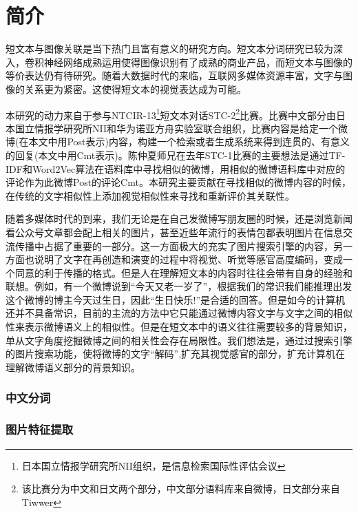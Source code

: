 \chapter{简介}
短文本与图像关联是当下热门且富有意义的研究方向。短文本分词研究已较为深入，卷积神经网络成熟运用使得图像识别有了成熟的商业产品，而短文本与图像的等价表达仍有待研究。随着大数据时代的来临，互联网多媒体资源丰富，文字与图像的关系更为紧密。这使得短文本的视觉表达成为可能。

本研究的动力来自于参与NTCIR-13\footnote{日本国立情报学研究所NII组织，是信息检索国际性评估会议}短文本对话STC-2\footnote{该比赛分为中文和日文两个部分，中文部分语料库来自微博，日文部分来自Tiwwer }比赛。比赛中文部分由日本国立情报学研究所NII和华为诺亚方舟实验室联合组织，比赛内容是给定一个微博(在本文中用Post表示)内容，构建一个检索或者生成系统来得到连贯的、有意义的回复(本文中用Cmt表示)。陈仲夏师兄在去年STC-1比赛的主要想法是通过TF-IDF和Word2Vec算法在语料库中寻找相似的微博，用相似的微博语料库中对应的评论作为此微博Post的评论Cmt。本研究主要贡献在寻找相似的微博内容的时候，在传统的文字相似性上添加视觉相似性来寻找和重新评价其关联性。

随着多媒体时代的到来，我们无论是在自己发微博写朋友圈的时候，还是浏览新闻看公众号文章都会配上相关的图片，甚至近些年流行的表情包都表明图片在信息交流传播中占据了重要的一部分。这一方面极大的充实了图片搜索引擎的内容，另一方面也说明了文字在再创造和演变的过程中将视觉、听觉等感官高度编码，变成一个同意的利于传播的格式。但是人在理解短文本的内容时往往会带有自身的经验和联想。例如，有一个微博说到“今天又老一岁了”，根据我们的常识我们能推理出发这个微博的博主今天过生日，因此“生日快乐!”是合适的回答。但是如今的计算机还并不具备常识，目前的主流的方法中它只能通过微博内容文字与文字之间的相似性来表示微博语义上的相似性。但是在短文本中的语义往往需要较多的背景知识，单从文字角度挖掘微博之间的相关性会存在局限性。我们想法是，通过过搜索引擎的图片搜索功能，使将微博的文字“解码”,扩充其视觉感官的部分，扩充计算机在理解微博语义部分的背景知识。




\subsection{中文分词}

\subsection{图片特征提取}


